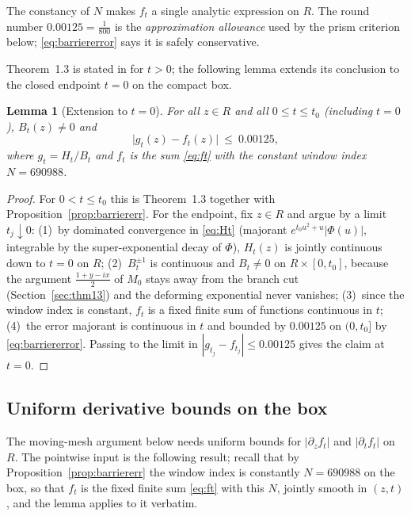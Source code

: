 \documentclass[11pt]{article}
\newtheorem{lemma}[theorem]{Lemma}
\theoremstyle{definition}
\begin{document}
The constancy of $N$ makes $f_t$ a single analytic
expression on $R$. The round number $0.00125=\frac1{800}$ is the
\emph{approximation allowance} used by the prism criterion below;
\eqref{eq:barriererror} says it is safely conservative.

Theorem~1.3 is stated in \cite{Polymath} for $t>0$; the following
lemma extends its conclusion to the closed endpoint $t=0$ on the
compact box.

\begin{lemma}[Extension to $t=0$]\label{lem:tzero}
For all $z\in R$ and all $0\le t\le t_0$ (including $t=0$),
$B_t(z)\neq0$ and
\[
\bigl|g_t(z)-f_t(z)\bigr|\ \le\ 0.00125,
\]
where $g_t=H_t/B_t$ and $f_t$ is the sum \eqref{eq:ft} with the
constant window index $N=690988$.
\end{lemma}

\begin{proof}
For $0<t\le t_0$ this is Theorem~1.3 together with
Proposition~\ref{prop:barriererr}. For the endpoint, fix $z\in R$
and argue by a limit $t_j\downarrow0$: (1)~by dominated convergence
in \eqref{eq:Ht} (majorant $e^{t_0u^2+u}|\Phi(u)|$, integrable by
the super-exponential decay of $\Phi$), $H_t(z)$ is jointly
continuous down to $t=0$ on $R$; (2)~$B_t^{\pm1}$ is continuous and
$B_t\neq0$ on $R\times[0,t_0]$, because the argument
$\frac{1+y-ix}{2}$ of $M_0$ stays away from the branch cut
(Section~\ref{sec:thm13}) and the deforming exponential never
vanishes; (3)~since the window index is constant, $f_t$ is a fixed
finite sum of functions continuous in $t$; (4)~the error majorant is
continuous in $t$ and bounded by $0.00125$ on $(0,t_0]$ by
\eqref{eq:barriererror}. Passing to the limit in
$|g_{t_j}-f_{t_j}|\le0.00125$ gives the claim at $t=0$.
\end{proof}

\subsection{Uniform derivative bounds on the box}\label{sec:derivbox}

The moving-mesh argument below needs uniform bounds for
$|\partial_zf_t|$ and $|\partial_tf_t|$ on $R$. The pointwise input
is the following result; recall that by
Proposition~\ref{prop:barriererr} the window index is constantly
$N=690988$ on the box, so that $f_t$ is the fixed finite sum
\eqref{eq:ft} with this $N$, jointly smooth in $(z,t)$, and the
lemma applies to it verbatim.
\end{document}
